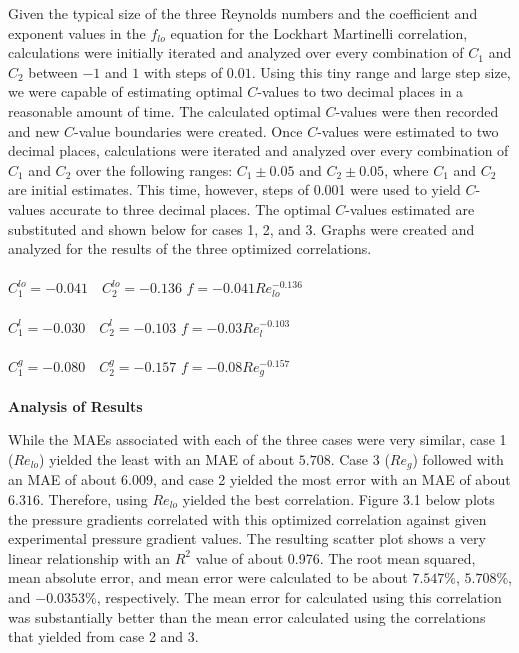 Given the typical size of the three Reynolds numbers and the coefficient and exponent values in the \(f_{lo}\) equation for the Lockhart Martinelli correlation, calculations were initially iterated and analyzed over every combination of \(C_1\) and \(C_2\) between \(-1\) and \(1\) with steps of \(0.01\). Using this tiny range and large step size, we were capable of estimating optimal \(C\)-values to two decimal places in a reasonable amount of time. The calculated optimal \(C\)-values were then recorded and new \(C\)-value boundaries were created. Once \(C\)-values were estimated to two decimal places, calculations were iterated and analyzed over every combination of \(C_1\) and \(C_2\) over the following ranges: \(C_1\pm 0.05\) and \(C_2\pm 0.05\), where \(C_1\) and \(C_2\) are initial estimates. This time, however, steps of 0.001 were used to yield \(C\)-values accurate to three decimal places. The optimal \(C\)-values estimated are substituted and shown below for cases 1, 2, and 3. Graphs were created and analyzed for the results of the three optimized correlations.\\
\\
\(C_1^{lo}=-0.041\quad C_2^{lo}=-0.136\) \dotfill \(f=-0.041Re_{lo}^{-0.136}\)\\
\\
\(C_1^{l}=-0.030\quad C_2^{l}=-0.103\) \dotfill \(f=-0.03Re_{l}^{-0.103}\)\\
\\
\(C_1^{g}=-0.080\quad C_2^{g}=-0.157\) \dotfill \(f=-0.08Re_{g}^{-0.157}\)\\
\\
\textbf{Analysis of Results}

While the MAEs associated with each of the three cases were very similar, case 1 (\(Re_{lo}\)) yielded the least with an MAE of about \(5.708\). Case 3 (\(Re_g\)) followed with an MAE of about \(6.009\), and case 2 yielded the most error with an MAE of about \(6.316\). Therefore, using \(Re_{lo}\) yielded the best correlation. Figure 3.1 below plots the pressure gradients correlated with this optimized correlation against given experimental pressure gradient values. The resulting scatter plot shows a very linear relationship with an \(R^2\) value of about 0.976. The root mean squared, mean absolute error, and mean error were calculated to be about \(7.547\%\), \(5.708\%\), and \(-0.0353\%\), respectively. The mean error for calculated using this correlation was substantially better than the mean error calculated using the correlations that yielded from case 2 and 3.\\

